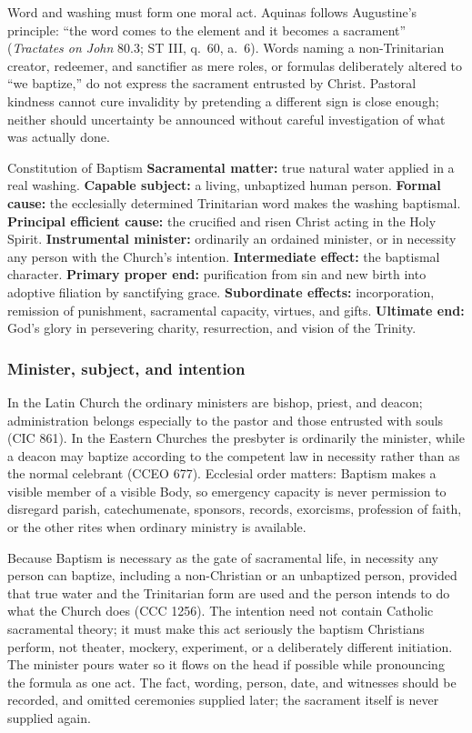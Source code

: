 Word and washing must form one moral act. Aquinas follows Augustine's principle: ``the word comes to the element and it becomes a sacrament'' (\emph{Tractates on John} 80.3; ST III, q.~60, a.~6). Words naming a non-Trinitarian creator, redeemer, and sanctifier as mere roles, or formulas deliberately altered to ``we baptize,'' do not express the sacrament entrusted by Christ. Pastoral kindness cannot cure invalidity by pretending a different sign is close enough; neither should uncertainty be announced without careful investigation of what was actually done.

\begin{massbox}{Constitution of Baptism}
\textbf{Sacramental matter:} true natural water applied in a real washing. \textbf{Capable subject:} a living, unbaptized human person. \textbf{Formal cause:} the ecclesially determined Trinitarian word makes the washing baptismal. \textbf{Principal efficient cause:} the crucified and risen Christ acting in the Holy Spirit. \textbf{Instrumental minister:} ordinarily an ordained minister, or in necessity any person with the Church's intention. \textbf{Intermediate effect:} the baptismal character. \textbf{Primary proper end:} purification from sin and new birth into adoptive filiation by sanctifying grace. \textbf{Subordinate effects:} incorporation, remission of punishment, sacramental capacity, virtues, and gifts. \textbf{Ultimate end:} God's glory in persevering charity, resurrection, and vision of the Trinity.
\end{massbox}

\subsubsection{Minister, subject, and intention}

In the Latin Church the ordinary ministers are bishop, priest, and deacon; administration belongs especially to the pastor and those entrusted with souls (CIC 861). In the Eastern Churches the presbyter is ordinarily the minister, while a deacon may baptize according to the competent law in necessity rather than as the normal celebrant (CCEO 677). Ecclesial order matters: Baptism makes a visible member of a visible Body, so emergency capacity is never permission to disregard parish, catechumenate, sponsors, records, exorcisms, profession of faith, or the other rites when ordinary ministry is available.

Because Baptism is necessary as the gate of sacramental life, in necessity any person can baptize, including a non-Christian or an unbaptized person, provided that true water and the Trinitarian form are used and the person intends to do what the Church does (CCC 1256). The intention need not contain Catholic sacramental theory; it must make this act seriously the baptism Christians perform, not theater, mockery, experiment, or a deliberately different initiation. The minister pours water so it flows on the head if possible while pronouncing the formula as one act. The fact, wording, person, date, and witnesses should be recorded, and omitted ceremonies supplied later; the sacrament itself is never supplied again.

